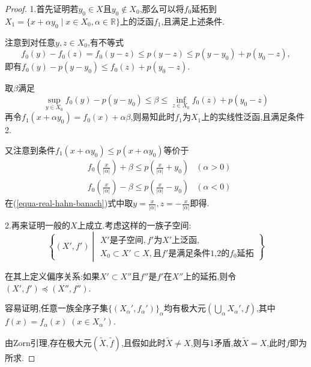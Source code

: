 \documentclass{ctexart}
\theoremstyle{definition}
\theoremstyle{remark}
\begin{document}
	\begin{proof}
		1.首先证明若$y_0\in X$且$y_0\notin X_0$,那么可以将$f_0$延拓到$X_1=\{x+\alpha y_0\mid x\in X_0,\alpha\in\mathbb{R}\}$上的泛函$f_1$,且满足上述条件.
			
		注意到对任意$y,z\in X_0$,有不等式
		$$f_0(y)-f_0(z)=f_0(y-z)\le p(y-z)\le p(y-y_0)+p(y_0-z),$$
		即有$f_0(y)-p(y-y_0)\le f_0(z)+p(y_0-z)$.
		
		取$\beta$满足
		\begin{equation}
			\sup_{y\in X_0}{f_0(y)-p(y-y_0)}\le\beta\le\inf_{z\in X_0}{f_0(z)+p(y_0-z)} \tag{*} \label{equa-real-hahn-banach}
		\end{equation}
		再令$f_1(x+\alpha y_0)=f_0(x)+\alpha\beta$,则易知此时$f_1$为$X_1$上的实线性泛函,且满足条件2.
		
		又注意到条件$f_1(x+\alpha y_0)\le p(x+\alpha y_0)$等价于
		\begin{align*}
			& f_0\left(\frac{x}{|\alpha|}\right)+\beta\le p\left(\frac{x}{|\alpha|}+y_0\right) & (\alpha>0) \\
			& f_0\left(\frac{x}{|\alpha|}\right)-\beta\le p\left(\frac{x}{|\alpha|}-y_0\right) & (\alpha<0)
		\end{align*}
		在(\ref{equa-real-hahn-banach})式中取$y=\frac{x}{|\alpha|},z=-\frac{x}{|\alpha|}$即得.
		
		2.再来证明一般的$X$上成立.考虑这样的一族子空间:
		$$\left\{(X',f')\middle|
			\begin{array}{l}
				X'\mbox{是子空间},f'\mbox{为}X'\mbox{上泛函}, \\
				X_0\subset X'\subset X,\mbox{且}f'\mbox{是满足条件1,2的}f_0\mbox{延拓}
			\end{array}
		\right\}$$
		
		在其上定义偏序关系:如果$X'\subset X''$且$f''$是$f'$在$X''$上的延拓,则令$(X',f')\preceq(X'',f'')$.
		
		容易证明,任意一族全序子集$\{(X_\alpha',f_\alpha')\}_\alpha$均有极大元$\left(\bigcup_\alpha{X_\alpha'},f\right)$,其中$f(x)=f_\alpha(x)\;(x\in X_\alpha')$.
		
		由Zorn引理,存在极大元$(\tilde{X},\tilde{f})$,且假如此时$\tilde{X}\ne X$,则与1矛盾,故$\tilde{X}=X$,此时$f$即为所求.
	\end{proof}
	
\end{document}
